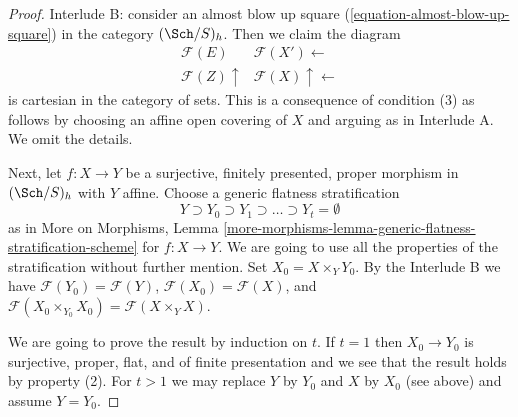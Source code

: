 \begin{proof}
\medskip\noindent
Interlude B: consider an almost blow up square
(\ref{equation-almost-blow-up-square}) in the category $(\Sch/S)_h$.
Then we claim the diagram
$$
\begin{array}{cc}\mathcal{F}(E) & \mathcal{F}(X') \longleftarrow \\ \mathcal{F}(Z) \uparrow & \mathcal{F}(X) \uparrow\longleftarrow\end{array}
$$
is cartesian in the category of sets. This is a consequence of condition
(3) as follows by choosing an affine open covering of $X$ and arguing
as in Interlude A. We omit the details.

\medskip\noindent
Next, let $f : X \to Y$ be a surjective, finitely presented, proper morphism
in $(\Sch/S)_h$ with $Y$ affine. Choose a generic flatness stratification
$$
Y \supset Y_0 \supset Y_1 \supset \ldots \supset Y_t = \emptyset
$$
as in More on Morphisms, Lemma
\ref{more-morphisms-lemma-generic-flatness-stratification-scheme}
for $f : X \to Y$.
We are going to use all the properties of the stratification
without further mention. Set $X_0 = X \times_Y Y_0$.
By the Interlude B we have $\mathcal{F}(Y_0) = \mathcal{F}(Y)$,
$\mathcal{F}(X_0) = \mathcal{F}(X)$, and
$\mathcal{F}(X_0 \times_{Y_0} X_0) = \mathcal{F}(X \times_Y X)$.

\medskip\noindent
We are going to prove the result by induction on $t$. If $t = 1$
then $X_0 \to Y_0$ is surjective, proper, flat, and of finite presentation
and we see that the result holds by property (2).
For $t > 1$ we may replace $Y$ by $Y_0$ and $X$ by $X_0$
(see above) and assume $Y = Y_0$.


\end{proof}
